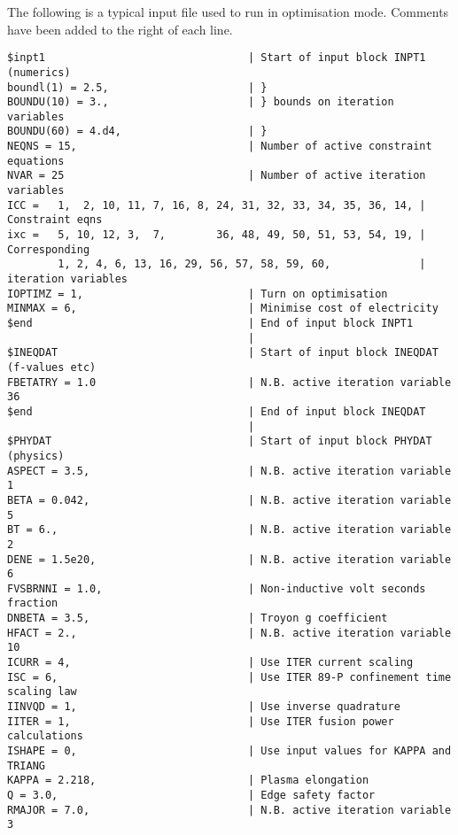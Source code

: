 \label{app:infile2}

The following is a typical input file used to run \PS in optimisation
mode. Comments have been added to the right of each line.

\footnotesize
\begin{verbatim}
$inpt1                                | Start of input block INPT1 (numerics)
boundl(1) = 2.5,                      | }
BOUNDU(10) = 3.,                      | } bounds on iteration variables
BOUNDU(60) = 4.d4,                    | }
NEQNS = 15,                           | Number of active constraint equations
NVAR = 25                             | Number of active iteration variables
ICC =   1,  2, 10, 11, 7, 16, 8, 24, 31, 32, 33, 34, 35, 36, 14, | Constraint eqns
ixc =   5, 10, 12, 3,  7,        36, 48, 49, 50, 51, 53, 54, 19, | Corresponding
        1, 2, 4, 6, 13, 16, 29, 56, 57, 58, 59, 60,              | iteration variables
IOPTIMZ = 1,                          | Turn on optimisation 
MINMAX = 6,                           | Minimise cost of electricity
$end                                  | End of input block INPT1
                                      | 
$INEQDAT                              | Start of input block INEQDAT (f-values etc)
FBETATRY = 1.0                        | N.B. active iteration variable 36
$end                                  | End of input block INEQDAT
                                      | 
$PHYDAT                               | Start of input block PHYDAT (physics)
ASPECT = 3.5,                         | N.B. active iteration variable 1
BETA = 0.042,                         | N.B. active iteration variable 5
BT = 6.,                              | N.B. active iteration variable 2
DENE = 1.5e20,                        | N.B. active iteration variable 6
FVSBRNNI = 1.0,                       | Non-inductive volt seconds fraction
DNBETA = 3.5,                         | Troyon g coefficient
HFACT = 2.,                           | N.B. active iteration variable 10
ICURR = 4,                            | Use ITER current scaling
ISC = 6,                              | Use ITER 89-P confinement time scaling law
IINVQD = 1,                           | Use inverse quadrature
IITER = 1,                            | Use ITER fusion power calculations
ISHAPE = 0,                           | Use input values for KAPPA and TRIANG
KAPPA = 2.218,                        | Plasma elongation
Q = 3.0,                              | Edge safety factor
RMAJOR = 7.0,                         | N.B. active iteration variable 3

\end{verbatim}
